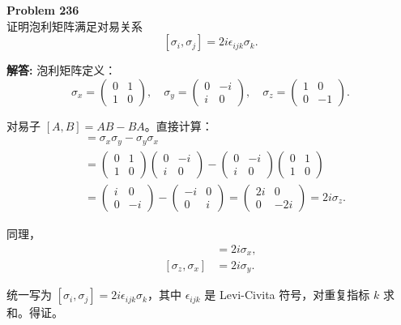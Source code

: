 \documentclass[12pt, a4paper, oneside]{ctexart}
\newenvironment{solution}{\par\noindent\textbf{解答:}\quad}{\par}
\begin{document}
\begin{mdframed}[backgroundcolor=gray!10, linewidth=0pt]
    \textbf{Problem 236} \\
    证明泡利矩阵满足对易关系
    \[
    [\sigma_i, \sigma_j] = 2 i \epsilon_{ijk} \sigma_k.
    \]
\end{mdframed}
\begin{solution}
    泡利矩阵定义：
    \[
    \sigma_x = \begin{pmatrix} 0 & 1 \\ 1 & 0 \end{pmatrix}, \quad
    \sigma_y = \begin{pmatrix} 0 & -i \\ i & 0 \end{pmatrix}, \quad
    \sigma_z = \begin{pmatrix} 1 & 0 \\ 0 & -1 \end{pmatrix}.
    \]
    
    对易子 $[A,B] = AB - BA$。直接计算：
    \begin{align*}
        [\sigma_x, \sigma_y] &= \sigma_x \sigma_y - \sigma_y \sigma_x \\
        &= \begin{pmatrix} 0 & 1 \\ 1 & 0 \end{pmatrix} \begin{pmatrix} 0 & -i \\ i & 0 \end{pmatrix} - \begin{pmatrix} 0 & -i \\ i & 0 \end{pmatrix} \begin{pmatrix} 0 & 1 \\ 1 & 0 \end{pmatrix} \\
        &= \begin{pmatrix} i & 0 \\ 0 & -i \end{pmatrix} - \begin{pmatrix} -i & 0 \\ 0 & i \end{pmatrix} = \begin{pmatrix} 2i & 0 \\ 0 & -2i \end{pmatrix} = 2i \sigma_z.
    \end{align*}
    
    同理，
    \begin{align*}
        [\sigma_y, \sigma_z] &= 2i \sigma_x, \\
        [\sigma_z, \sigma_x] &= 2i \sigma_y.
    \end{align*}
    
    统一写为 $[\sigma_i, \sigma_j] = 2i \epsilon_{ijk} \sigma_k$，其中 $\epsilon_{ijk}$ 是 Levi-Civita 符号，对重复指标 $k$ 求和。得证。
\end{solution}
\end{document}
